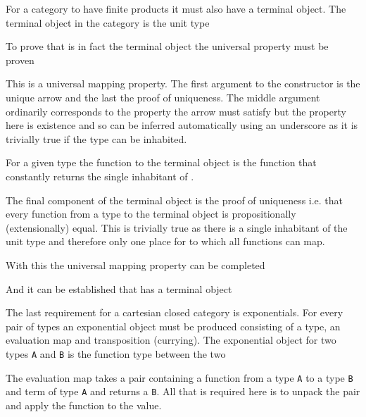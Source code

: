 For a category to have finite products it must also have a terminal object. The
terminal object in the category  is the unit type


To prove that  is in fact the terminal object the universal property
must be proven


This is a universal mapping property. The first argument to the constructor is
the unique arrow and the last the proof of uniqueness. The middle argument
ordinarily corresponds to the property the arrow must satisfy but the property
here is existence and so can be inferred automatically using an underscore as it
is trivially true if the type can be inhabited.

For a given type the function to the terminal object is the function that
constantly returns the single inhabitant of .


The final component of the terminal object is the proof of uniqueness i.e. that
every function from a type to the terminal object is propositionally
(extensionally) equal. This
is trivially true as there is a single inhabitant of the unit type and therefore
only one place for to which all functions can map.


With this the universal mapping property can be completed


And it can be established that  has a terminal object



The last requirement for a cartesian closed category is exponentials. For every
pair of types an exponential object must be produced consisting of a type, an
evaluation map and transposition (currying). The exponential object for two
types \verb|A| and \verb|B| is the function type between the two


The evaluation map takes a pair containing a function from a type \verb|A| to a
type \verb|B| and term of type \verb|A| and returns a \verb|B|. All that is
required here is to unpack the pair and apply the function to the value.

